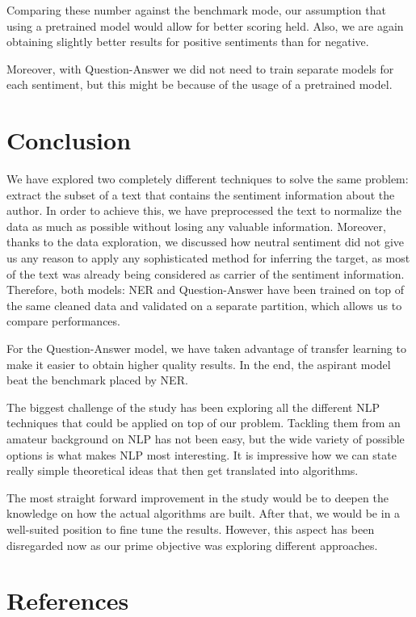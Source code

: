\documentclass[11pt]{article}
\begin{document}
Comparing these number against the benchmark mode, our assumption that using a pretrained model would allow for better scoring held. Also, we are again obtaining slightly better results for positive sentiments than for negative.

Moreover, with Question-Answer we did not need to train separate models for each sentiment, but this might be because of the usage of a pretrained model.

\section{Conclusion}

We have explored two completely different techniques to solve the same problem: extract the subset of a text that contains the sentiment information about the author. In order to achieve this, we have preprocessed the text to normalize the data as much as possible without losing any valuable information.
Moreover, thanks to the data exploration, we discussed how neutral sentiment did not give us any reason to apply any sophisticated method for inferring the target, as most of the text was already being considered as carrier of the sentiment information.
Therefore, both models: NER and Question-Answer have been trained on top of the same cleaned data and validated on a separate partition, which allows us to compare performances.

For the Question-Answer model, we have taken advantage of transfer learning to make it easier to obtain higher quality results. In the end, the aspirant model beat the benchmark placed by NER.

The biggest challenge of the study has been exploring all the different NLP techniques that could be applied on top of our problem. Tackling them from an amateur background on NLP has not been easy, but the wide variety of possible options is what makes NLP most interesting. It is impressive how we can state really simple theoretical ideas that then get translated into algorithms.

The most straight forward improvement in the study would be to deepen the knowledge on how the actual algorithms are built. After that, we would be in a well-suited position to fine tune the results. However, this aspect has been disregarded now as our prime objective was exploring different approaches.

\section{References}
\end{document}
